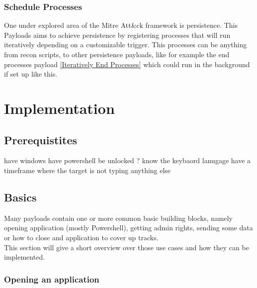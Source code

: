 \subsubsection{Schedule Processes}

One under explored area of the Mitre Att\&ck framework is persistence. This Payloads aims to achieve persistence by registering processes that will run iteratively depending on a customizable trigger. This processes can be anything from recon scripts, to other persistence payloads, like for example the end processes payload \ref{Iteratively End Processes} which could run in the background if set up like this.


\section{Implementation} \label{Implementation}

\subsection{Prerequistites}
have windows
have powershell
be unlocked ? 
know the keybaord lanugage
have a timeframe where the target is not typing anything else

\subsection{Basics}

Many payloads contain one or more common basic building blocks, namely opening application (mostly Powershell), getting admin rights, sending some data or how to close and application to cover up tracks.  \\
This section will give a short overview over those use cases and how they can be implemented.


\subsubsection{Opening an application}

